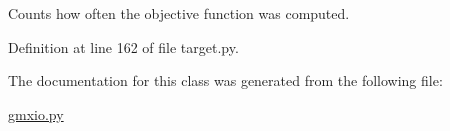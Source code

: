 Counts how often the objective function was computed. 



Definition at line 162 of file target.\-py.



The documentation for this class was generated from the following file\-:\begin{DoxyCompactItemize}
\item 
\hyperlink{gmxio_8py}{gmxio.\-py}\end{DoxyCompactItemize}
